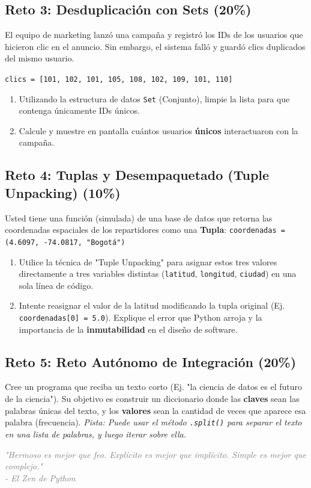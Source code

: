 \documentclass[12pt,a4paper]{article}
\begin{document}
\subsection*{Reto 3: Desduplicación con Sets (20\%)}
El equipo de marketing lanzó una campaña y registró los IDs de los usuarios que hicieron clic en el anuncio. Sin embargo, el sistema falló y guardó clics duplicados del mismo usuario.
\begin{center}
    \texttt{clics = [101, 102, 101, 105, 108, 102, 109, 101, 110]}
\end{center}
\begin{enumerate}
    \item Utilizando la estructura de datos \texttt{Set} (Conjunto), limpie la lista para que contenga únicamente IDs únicos.
    \item Calcule y muestre en pantalla cuántos usuarios \textbf{únicos} interactuaron con la campaña.
\end{enumerate}

\subsection*{Reto 4: Tuplas y Desempaquetado (Tuple Unpacking) (10\%)}
Usted tiene una función (simulada) de una base de datos que retorna las coordenadas espaciales de los repartidores como una \textbf{Tupla}: \texttt{coordenadas = (4.6097, -74.0817, "Bogotá")}
\begin{enumerate}
    \item Utilice la técnica de "Tuple Unpacking" para asignar estos tres valores directamente a tres variables distintas (\texttt{latitud}, \texttt{longitud}, \texttt{ciudad}) en una sola línea de código.
    \item Intente reasignar el valor de la latitud modificando la tupla original (Ej. \texttt{coordenadas[0] = 5.0}). Explique el error que Python arroja y la importancia de la \textbf{inmutabilidad} en el diseño de software.
\end{enumerate}

\subsection*{Reto 5: Reto Autónomo de Integración (20\%)}
Cree un programa que reciba un texto corto (Ej. "la ciencia de datos es el futuro de la ciencia").
Su objetivo es construir un diccionario donde las \textbf{claves} sean las palabras únicas del texto, y los \textbf{valores} sean la cantidad de veces que aparece esa palabra (frecuencia).
\textit{Pista: Puede usar el método \texttt{.split()} para separar el texto en una lista de palabras, y luego iterar sobre ella.}

\vspace{1cm}
\begin{center}
    \textit{\textcolor{gray}{"Hermoso es mejor que feo. Explícito es mejor que implícito. Simple es mejor que complejo." \\ - El Zen de Python}}
\end{center}
\end{document}
